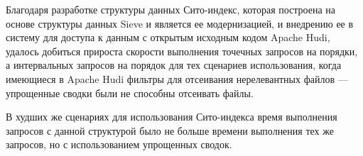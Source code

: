 Благодаря разработке структуры данных Сито-индекс, которая построена на основе структуры данных Sieve и является ее модернизацией, и внедрению ее в систему для доступа к данным с открытым исходным кодом Apache Hudi, удалось добиться прироста скорости выполнения точечных запросов на порядки, а интервальных запросов на порядок для тех сценариев использования, когда имеющиеся в Apache Hudi фильтры для отсеивания нерелевантных файлов --- упрощенные сводки были не способны отсеивать файлы.

В худших же сценариях для использования Сито-индекса время выполнения запросов с данной структурой было не больше времени выполнения тех же запросов, но с использованием упрощенных сводок.
